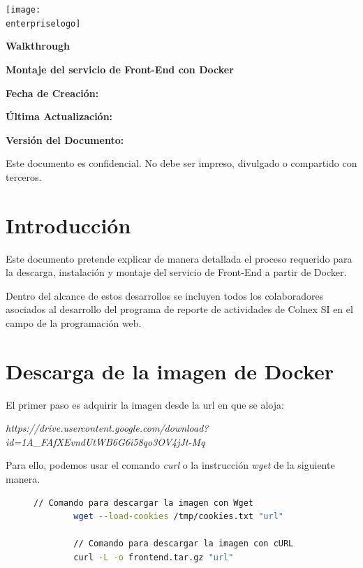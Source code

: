 \documentclass[11pt,a4paper]{article}
\newcommand{\enterpriselogo}{images/colnex.png}
\begin{document}
\begin{titlepage}
    \centering
    \texttt{[image: \\enterpriselogo]}
    \par
    \vfill
    {\LARGE\bfseries Walkthrough}
    \par\vspace{0.5cm}
    {\Large\bfseries Montaje del servicio de Front-End con Docker}
    \vfill
    \begin{flushright}
        {\large {\bfseries Fecha de Creación:} \gitcreated}\par\vspace{0.2cm}
        {\large {\bfseries Última Actualización:} \gitdate{}}\par\vspace{0.3cm}
        {\large {\bfseries Versión del Documento:} \gitversion{}}
    \end{flushright}
  \vfill
  Este documento es confidencial.
  No debe ser impreso, divulgado o compartido con terceros.
\end{titlepage}

\tableofcontents
\newpage
{}


\section{Introducción}
Este documento pretende explicar de manera detallada el proceso requerido para la descarga,
instalación y montaje del servicio de Front-End a partir de Docker.\par
Dentro del alcance de estos desarrollos se incluyen todos los colaboradores asociados al
desarrollo del programa de reporte de actividades de Colnex SI en el campo de la programación web.

\section{Descarga de la imagen de Docker}
El primer paso es adquirir la imagen desde la url en que se aloja:\par
\textit{https://drive.usercontent.google.com/download?id=1A\_FAfXEvndUtWB6G6i58qo3OV4jJt-Mq}\par
Para ello, podemos usar el comando \textit{curl} o la instrucción \textit{wget}
de la siguiente manera.

\begin{figure}[h]
    \begin{lstlisting}[language=Bash]
        // Comando para descargar la imagen con Wget
        wget --load-cookies /tmp/cookies.txt "url"

        // Comando para descargar la imagen con cURL
        curl -L -o frontend.tar.gz "url"
    \end{lstlisting}
\end{figure}
\end{document}
